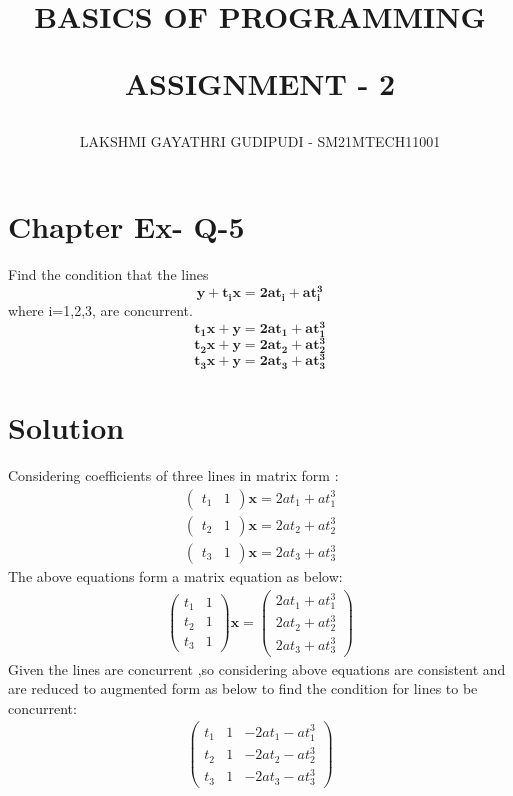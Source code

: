 \documentclass[journal,12pt,twocolumn]{IEEEtran}
\begin{document}
\newcommand{\myvec}[1]{\ensuremath{\begin{pmatrix}#1\end{pmatrix}}}
\newcommand{\cmyvec}[1]{\ensuremath{\begin{pmatrix*}[c]#1\end{pmatrix*}}}
\providecommand{\norm}[1]{\lVert#1\rVert}
\newcommand{\mydet}[1]{\ensuremath{\begin{vmatrix}#1\end{vmatrix}}}
\newcommand{\proj}[2]{\textbf{proj}_{\vec{#1}}\vec{#2}}
\newcommand{\abs}[1]{\left\lvert#1\right\rvert}
\newcommand{\RNum}[1]{\uppercase\expandafter{\romannumeral #1\relax}}
\newcommand{\Rnum}[1]{\lowercase\expandafter{\romannumeral #1\relax}}
\let\StandardTheFigure\thefigure
\let\vec\mathbf

\title{
BASICS OF PROGRAMMING

ASSIGNMENT - 2
}
\author{ LAKSHMI GAYATHRI GUDIPUDI - SM21MTECH11001}
\maketitle
\newpage
\bigskip
\renewcommand{\thefigure}{\theenumi}

\section*{ Chapter \RNum{3} Ex-\RNum{4} Q-5}
\noindent
Find the condition that the lines
$$\mathbf{y+t_i x=2at_i+at_i^3}$$
where i=1,2,3, are concurrent. 
$$\mathbf{t_1 x + y = 2at_1 +at_1^3}$$
$$\mathbf{t_2 x + y = 2at_2 +at_2^3}$$
$$\mathbf{t_3 x + y = 2at_3 +at_3^3}$$
\noindent
\section*{\textbf{Solution}}
\noindent
Considering coefficients of three lines in matrix form :
\begin{align}
\myvec{t_1&1}\vec{x}=2at_1+at_1^3\\
\myvec{t_2&1}\vec{x}=2at_2+at_2^3\\
\myvec{t_3&1}\vec{x}=2at_3+at_3^3
\end{align}
The above equations form a matrix equation as below:
\begin{align}
\myvec{t_1&1\\t_2&1\\t_3&1}\vec{x}=\myvec{2at_1+at_1^3\\2at_2+at_2^3\\2at_3+at_3^3}
\end{align}
Given the lines are concurrent ,so considering above equations are consistent and are reduced to augmented form as below to find the condition for lines to be concurrent:
\begin{align}
\myvec{
t_1&1&-2at_1-at_1^3\\
t_2&1&-2at_2-at_2^3\\
t_3&1&-2at_3-at_3^3
}
\end{align}
\end{document}
